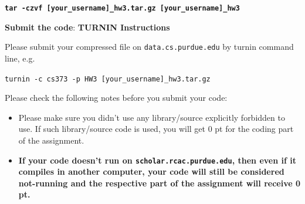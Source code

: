 \documentclass{article}
\newcommand{\homeworknumber}{3}
\begin{document}
\textbf{\texttt{tar -czvf [your\_username]\_hw\homeworknumber.tar.gz  [your\_username]\_hw\homeworknumber}} 


\hfill

\noindent \textbf{Submit the code}: 
{\bf TURNIN Instructions}

Please submit your compressed file on \texttt{data.cs.purdue.edu} by turnin command line, e.g. 

\texttt{turnin -c cs373 -p HW\homeworknumber{} [your\_username]\_hw\homeworknumber.tar.gz}

Please check the following notes before you submit your code:
\begin{itemize}
    \item Please make sure you didn't use any library/source explicitly forbidden to use. If such library/source code is used, you will get 0 pt for the coding part of the assignment. 
    \item {\bf If your code doesn't run on \texttt{scholar.rcac.purdue.edu}, then even if it compiles in another computer, your code will still be considered not-running and the respective part of the assignment will receive 0 pt.}
\end{itemize}
\end{document}
